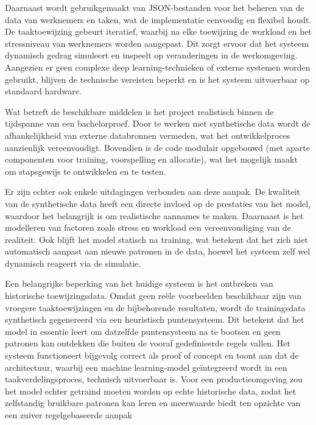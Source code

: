 Daarnaast wordt gebruikgemaakt van JSON-bestanden voor het beheren van de data van werknemers en taken, wat de implementatie eenvoudig en flexibel houdt. De taaktoewijzing gebeurt iteratief, waarbij na elke toewijzing de workload en het stressniveau van werknemers worden aangepast. Dit zorgt ervoor dat het systeem dynamisch gedrag simuleert en inspeelt op veranderingen in de werkomgeving. Aangezien er geen complexe deep learning-technieken of externe systemen worden gebruikt, blijven de technische vereisten beperkt en is het systeem uitvoerbaar op standaard hardware.

Wat betreft de beschikbare middelen is het project realistisch binnen de tijdspanne van een bachelorproef. Door te werken met synthetische data wordt de afhankelijkheid van externe databronnen vermeden, wat het ontwikkelproces aanzienlijk vereenvoudigt. Bovendien is de code modulair opgebouwd (met aparte componenten voor training, voorspelling en allocatie), wat het mogelijk maakt om stapsgewijs te ontwikkelen en te testen.

\vspace{1em}Er zijn echter ook enkele uitdagingen verbonden aan deze aanpak. De kwaliteit van de synthetische data heeft een directe invloed op de prestaties van het model, waardoor het belangrijk is om realistische aannames te maken. Daarnaast is het modelleren van factoren zoals stress en workload een vereenvoudiging van de realiteit. Ook blijft het model statisch na training, wat betekent dat het zich niet automatisch aanpast aan nieuwe patronen in de data, hoewel het systeem zelf wel dynamisch reageert via de simulatie.

Een belangrijke beperking van het huidige systeem is het ontbreken van historische toewijzingsdata. Omdat geen reële voorbeelden beschikbaar zijn van vroegere taaktoewijzingen en de bijbehorende resultaten, wordt de trainingsdata synthetisch gegenereerd via een heuristisch puntensysteem. Dit betekent dat het model in essentie leert om datzelfde puntensysteem na te bootsen en geen patronen kan ontdekken die buiten de vooraf gedefinieerde regels vallen. Het systeem functioneert bijgevolg correct als proof of concept en toont aan dat de architectuur, waarbij een machine learning-model geïntegreerd wordt in een taakverdelingsproces, technisch uitvoerbaar is. Voor een productieomgeving zou het model echter getraind moeten worden op echte historische data, zodat het zelfstandig bruikbare patronen kan leren en meerwaarde biedt ten opzichte van een zuiver regelgebaseerde aanpak

